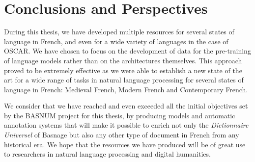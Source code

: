 \chapter{Conclusions and Perspectives}\label{chap:conclusions}

During this thesis, we have developed multiple resources for several states of language in French, and even for a wide variety of languages in the case of OSCAR. We have chosen to focus on the development of data for the pre-training of language models rather than on the architectures themselves. This approach proved to be extremely effective as we were able to establish a new state of the art for a wide range of tasks in natural language processing for several states of language in French: Medieval French, Modern French and Contemporary French.

We consider that we have reached and even exceeded all the initial objectives set by the BASNUM project for this thesis, by producing models and automatic annotation systems that will make it possible to enrich not only the \emph{Dictionnaire Universel} of Basnage but also any other type of document in French from any historical era. We hope that the resources we have produced will be of great use to researchers in natural language processing and digital humanities.